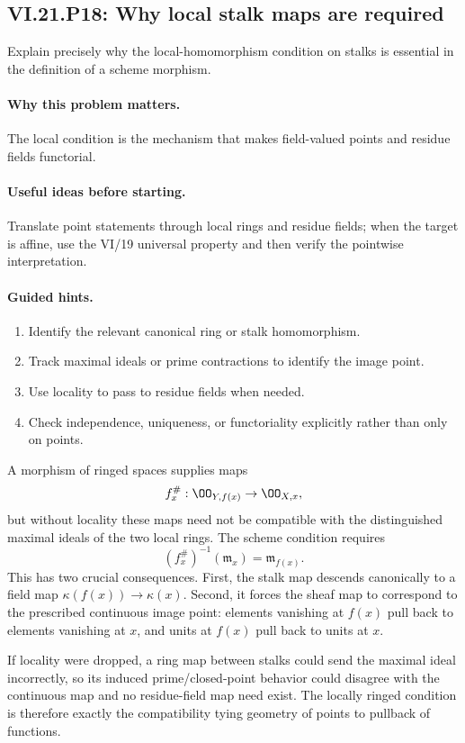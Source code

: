 \subsection*{VI.21.P18: Why local stalk maps are required}
\begin{problem}\label{prob:vi21-p18}
Explain precisely why the local-homomorphism condition on stalks is essential in the definition of a scheme morphism.
\end{problem}

\ifdefined\FullProblemDossiers
\paragraph{Why this problem matters.}
The local condition is the mechanism that makes field-valued points and residue fields functorial.

\paragraph{Useful ideas before starting.}
Translate point statements through local rings and residue fields; when the target is affine, use the VI/19 universal property and then verify the pointwise interpretation.

\paragraph{Guided hints.}
\begin{enumerate}
\item Identify the relevant canonical ring or stalk homomorphism.
\item Track maximal ideals or prime contractions to identify the image point.
\item Use locality to pass to residue fields when needed.
\item Check independence, uniqueness, or functoriality explicitly rather than only on points.
\end{enumerate}

\begin{solution}
A morphism of ringed spaces supplies maps
\[
f_x^\#:\OO_{Y,f(x)}\to\OO_{X,x},
\]
but without locality these maps need not be compatible with the distinguished maximal ideals of
the two local rings.  The scheme condition requires
\[
(f_x^\#)^{-1}(\mathfrak m_x)=\mathfrak m_{f(x)}.
\]
This has two crucial consequences.  First, the stalk map descends canonically to a field map
$\kappa(f(x))\to\kappa(x)$.  Second, it forces the sheaf map to correspond to the prescribed
continuous image point: elements vanishing at $f(x)$ pull back to elements vanishing at $x$, and
units at $f(x)$ pull back to units at $x$.

If locality were dropped, a ring map between stalks could send the maximal ideal incorrectly, so
its induced prime/closed-point behavior could disagree with the continuous map and no residue-field
map need exist.  The locally ringed condition is therefore exactly the compatibility tying
geometry of points to pullback of functions.
\end{solution}

